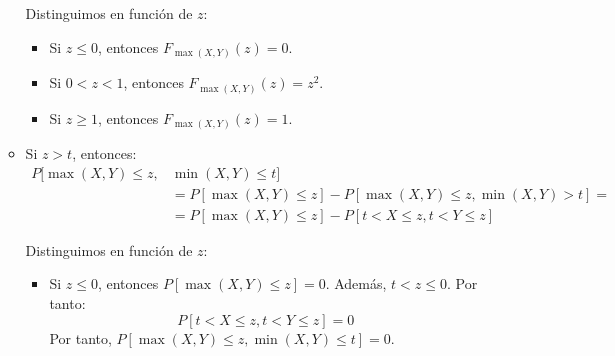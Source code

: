 \documentclass[12pt]{article}
\begin{document}
\begin{ejercicio}
\begin{enumerate}
\begin{itemize}
                Distinguimos en función de $z$:
                \begin{itemize}
                    \item Si $z\leq 0$, entonces $F_{\max(X,Y)}(z)=0$.
                    \item Si $0<z<1$, entonces $F_{\max(X,Y)}(z)=z^2$.
                    \item Si $z\geq 1$, entonces $F_{\max(X,Y)}(z)=1$.
                \end{itemize}
    
                \item Si $z>t$, entonces:
                \begin{align*}
                    P[\max(X,Y)\leq z,&\min(X,Y)\leq t]
                    \\&=P[\max(X,Y)\leq z]-P[\max(X,Y)\leq z,\min(X,Y)> t]
                    =\\&= P[\max(X,Y)\leq z]-P[t<X\leq z,t<Y\leq z]
                \end{align*}
    
                Distinguimos en función de $z$:
                \begin{itemize}
                    \item Si $z\leq 0$, entonces $P[\max(X,Y)\leq z]=0$. Además, $t<z\leq 0$. Por tanto:
                    \begin{equation*}
                        P[t<X\leq z,t<Y\leq z]=0
                    \end{equation*}
                    Por tanto, $P[\max(X,Y)\leq z,\min(X,Y)\leq t]=0$.
    

\end{itemize}
\end{itemize}
\end{enumerate}
\end{ejercicio}
\end{document}
